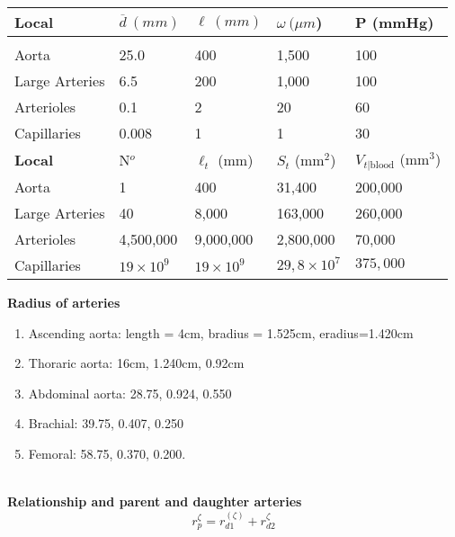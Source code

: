 \begin{table}[h!] %
    \centering
    \begin{tabularx}{\textwidth}{X X X X X}
    \toprule
    \textbf{Local} & $\overline{d} \ (mm)$    & $\ell \ (mm)$ & $\omega \ (\mu m$) & P (mmHg) \\[3pt] 
    \hline\\[0.5pt] 
    Aorta & 25.0 & 400 & 1,500 & 100 \\[6pt]
    Large Arteries & 6.5 & 200 & 1,000 & 100 \\[6pt]
    Arterioles & 0.1 & 2 & 20 & 60 \\[6pt]
    Capillaries & 0.008 & 1 & 1 & 30 \\[12pt]
    \midrule
    \textbf{Local} & N$^o$ & $\ell_t$ (mm) & $S_t$ (mm$^2$) & $V_{t | \text{blood}}$ (mm$^3$)\\
    \midrule 
    Aorta & 1 & 400 & 31,400 & 200,000 \\[6pt]
    Large Arteries & 40 & 8,000 & 163,000 & 260,000 \\[6pt]
    Arterioles & 4,500,000 & 9,000,000 & 2,800,000 & 70,000 \\[6pt]
    Capillaries & $19 \times 10^9$ & $19 \times 10^9$ & $29,8 \times 10^7$ & $375,000$ \\[12pt]
    \bottomrule
    \end{tabularx}
\end{table}
\newpage

\textbf{Radius of arteries} \\

\begin{enumerate}
    \item Ascending aorta: length = 4cm, bradius = 1.525cm, eradius=1.420cm \\
    \item Thoraric aorta: 16cm, 1.240cm, 0.92cm \\
    \item Abdominal aorta: 28.75, 0.924, 0.550 \\
    \item Brachial: 39.75, 0.407, 0.250 \\
    \item Femoral: 58.75, 0.370, 0.200.
\end{enumerate} \\
\vspace{1em}
\textbf{Relationship and parent and daughter arteries} \\

\begin{equation}
    r^{\zeta}_{p} = r^(\zeta)_{d1} + r^{\zeta}_{d2}
\end{equation} \\

